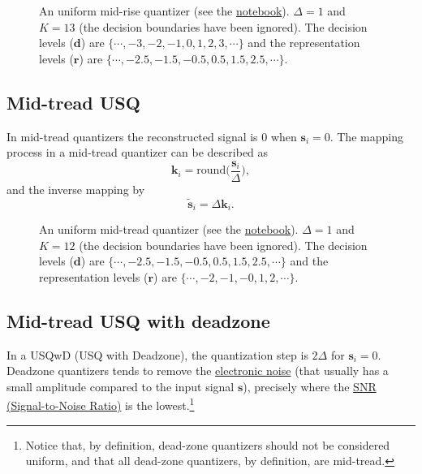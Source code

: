 \begin{figure}
  \caption{An uniform mid-rise quantizer (see the
    \href{https://github.com/vicente-gonzalez-ruiz/scalar_quantization/blob/master/docs/graphics/midrise.ipynb}{notebook}). $\Delta=1$
    and $K=13$ (the decision boundaries have been ignored). The
    decision levels (${\mathbf d}$) are $\{\cdots,-3,-2,-1,0,1,2,3,\cdots\}$
    and the representation levels (${\mathbf r}$) are
    $\{\cdots,-2.5,-1.5,-0.5,0.5,1.5,2.5,\cdots\}$.}
  \label{fig:midrise}
\end{figure}

\subsection{Mid-tread USQ}

In mid-tread quantizers the reconstructed signal is $0$ when ${\mathbf
  s}_i=0$. The mapping process in a mid-tread quantizer can be described as
\begin{equation}
  {\mathbf k}_i = \mathrm{round}\Big( \frac{{\mathbf s}_i}{\Delta} \Big),
  \label{eq:midrise}
\end{equation}
and the inverse mapping by
\begin{equation}
  \tilde{\mathbf s}_i = \Delta{\mathbf k}_i.
  \label{eq:inverse_midrise}
\end{equation}

\begin{figure}
  \caption{An uniform mid-tread quantizer (see the
    \href{https://github.com/vicente-gonzalez-ruiz/scalar_quantization/blob/master/docs/graphics/midtread.ipynb}{notebook}). $\Delta=1$
    and $K=12$ (the decision boundaries have been ignored). The
    decision levels (${\mathbf d}$) are $\{\cdots,-2.5,-1.5,-0.5,0.5,1.5,2.5,\cdots\}$
    and the representation levels (${\mathbf r}$) are
    $\{\cdots,-2,-1,-0,1,2,\cdots\}$.}
  \label{fig:midtread}
\end{figure}

\subsection{Mid-tread USQ with deadzone}

In a USQwD (USQ with Deadzone), the quantization step is $2\Delta$ for
${\mathbf s}_i=0$. Deadzone quantizers tends to remove the
\href{https://en.wikipedia.org/wiki/Noise_(electronics)}{electronic
  noise} (that usually has a small amplitude compared to the input
signal ${\mathbf s}$), precisely where the
\href{https://en.wikipedia.org/wiki/Signal-to-noise_ratio}{SNR
  (Signal-to-Noise Ratio)} is the lowest.\footnote{Notice that, by
  definition, dead-zone quantizers should not be considered uniform,
  and that all dead-zone quantizers, by definition, are mid-tread.}

